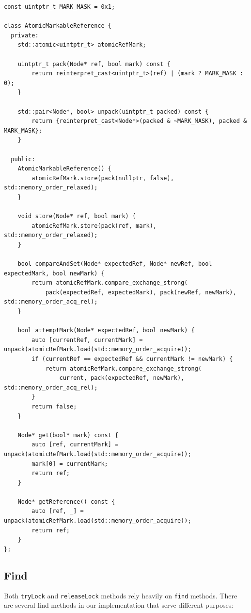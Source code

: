 \begin{lstlisting}[style=mystyle, caption=AtomicMarkableReference class implementation,label={}]
const uintptr_t MARK_MASK = 0x1;

class AtomicMarkableReference {
  private:
    std::atomic<uintptr_t> atomicRefMark;

    uintptr_t pack(Node* ref, bool mark) const {
        return reinterpret_cast<uintptr_t>(ref) | (mark ? MARK_MASK : 0);
    }

    std::pair<Node*, bool> unpack(uintptr_t packed) const {
        return {reinterpret_cast<Node*>(packed & ~MARK_MASK), packed & MARK_MASK};
    }
    
  public:
    AtomicMarkableReference() {
        atomicRefMark.store(pack(nullptr, false), std::memory_order_relaxed);
    }

    void store(Node* ref, bool mark) {
        atomicRefMark.store(pack(ref, mark), std::memory_order_relaxed);
    }

    bool compareAndSet(Node* expectedRef, Node* newRef, bool expectedMark, bool newMark) {
        return atomicRefMark.compare_exchange_strong(
            pack(expectedRef, expectedMark), pack(newRef, newMark), std::memory_order_acq_rel);
    }

    bool attemptMark(Node* expectedRef, bool newMark) {
        auto [currentRef, currentMark] = unpack(atomicRefMark.load(std::memory_order_acquire));
        if (currentRef == expectedRef && currentMark != newMark) {
            return atomicRefMark.compare_exchange_strong(
                current, pack(expectedRef, newMark), std::memory_order_acq_rel);
        }
        return false;
    }

    Node* get(bool* mark) const {
        auto [ref, currentMark] = unpack(atomicRefMark.load(std::memory_order_acquire));
        mark[0] = currentMark;
        return ref;
    }

    Node* getReference() const {
        auto [ref, _] = unpack(atomicRefMark.load(std::memory_order_acquire));
        return ref;
    }
};
\end{lstlisting}

\subsection{Find}\label{subsec:find}

Both \texttt{tryLock} and \texttt{releaseLock} methods rely heavily on \texttt{find} methods.
There are several find methods in our implementation that serve different purposes:

